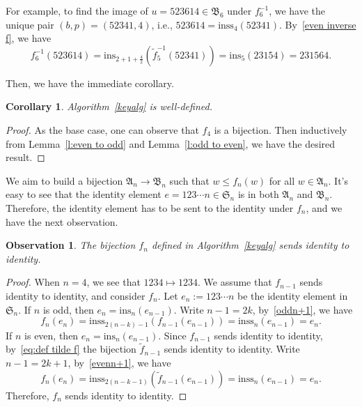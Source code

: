 \documentclass[12pt]{amsart}
\newtheorem{cor}[thm]{Corollary}
\newtheorem{obs}[thm]{Observation}
\theoremstyle{definition}
\numberwithin{equation}{section}
\newcommand{\sn}{\mathfrak{S}_n}
\newcommand{\defeq}{:=}
\newcommand{\ins}[1]{\mathrm{ins}_{#1}}
\newcommand{\inss}[1]{\mathrm{inss}_{#1}}
\begin{document}
For example, to find the image of $u=523614 \in \mathfrak B_6$ under $f_6^{-1}$, we have the unique pair $(b,p) = (52341,4)$, i.e., $523614 = \inss{4}(52341)$. By~\eqref{even inverse f}, we have
\begin{equation*}
    f_6^{-1}(523614) = \ins{2+1+\frac{4}{2}} (\tilde{f}_5^{-1}(52341)) = \ins{5}(23154) = 231564.
\end{equation*}

Then, we have the immediate corollary.

\begin{cor}
    Algorithm~\ref{keyalg} is well-defined.
\end{cor}
\begin{proof}
    As the base case, one can observe that $f_4$ is a bijection. Then inductively from Lemma~\ref{l:even to odd} and Lemma~\ref{l:odd to even}, we have the desired result.
\end{proof}

We aim to build a bijection $\mathfrak A_n \rightarrow \mathfrak B_n$ such that $w \leq f_n(w)$ for all $w\in \mathfrak A_n$. It's easy to see that the identity element $e=123\cdots n \in \sn$ is in both $\mathfrak A_n$ and $\mathfrak B_n$. Therefore, the identity element has to be sent to the identity under $f_n$, and we have the next observation.

\begin{obs}\label{o:identity to identity}
    The bijection $f_n$ defined in Algorithm~\ref{keyalg} sends identity to identity.
\end{obs}
\begin{proof}
    When $n=4$, we see that $1234 \longmapsto 1234$. We assume that $f_{n-1}$ sends identity to identity, and consider $f_n$. Let $e_n \defeq 123\cdots n$ be the identity element in $\sn$. If $n$ is odd, then $e_n = \ins{n} (e_{n-1})$. Write $n-1 = 2k$, by~\eqref{oddn+1}, we have
    \begin{equation*}
        f_{n}(e_n) = \inss{2(n-k)-1} (f_{n-1}(e_{n-1})) = \inss{n} (e_{n-1}) = e_n.
    \end{equation*}
    If $n$ is even, then $e_n = \ins n (e_{n-1})$. Since $f_{n-1}$ sends identity to identity, by~\eqref{eq:def tilde f} the bijection $\tilde{f}_{n-1}$ sends identity to identity. Write $n-1 = 2k+1$, by~\eqref{evenn+1}, we have
    \begin{equation}
        f_n(e_n) = \inss{2(n-k-1)}(\tilde{f}_{n-1}(e_{n-1})) = \inss{n}(e_{n-1}) = e_n.
    \end{equation}
    Therefore, $f_n$ sends identity to identity.
\end{proof}
\end{document}
